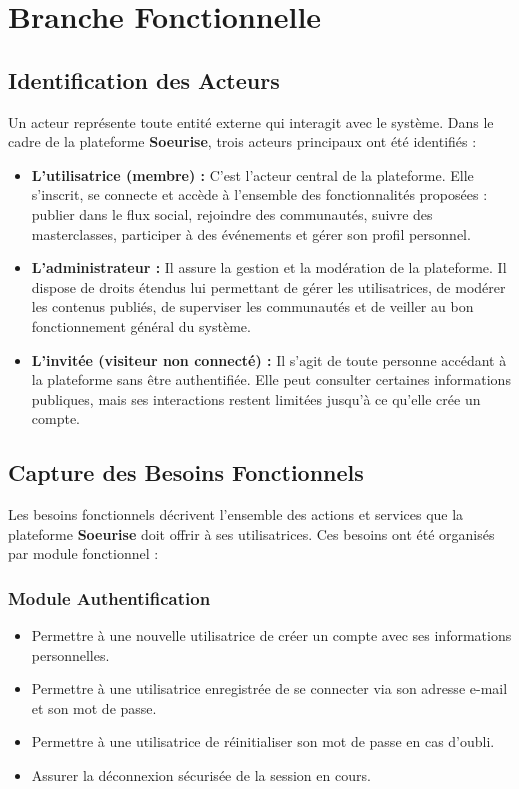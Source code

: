 \documentclass[12pt,a4paper]{report}
\begin{document}
	\section{Branche Fonctionnelle}
	
	\subsection{Identification des Acteurs}
	
	Un acteur représente toute entité externe qui interagit avec le système. Dans le 
	cadre de la plateforme \textbf{Soeurise}, trois acteurs principaux ont été identifiés :
	
	\begin{itemize}
		\item \textbf{L'utilisatrice (membre) :} C'est l'acteur central de la plateforme. 
		Elle s'inscrit, se connecte et accède à l'ensemble des fonctionnalités proposées : 
		publier dans le flux social, rejoindre des communautés, suivre des masterclasses, 
		participer à des événements et gérer son profil personnel.
		
		\item \textbf{L'administrateur :} Il assure la gestion et la modération de la 
		plateforme. Il dispose de droits étendus lui permettant de gérer les utilisatrices, 
		de modérer les contenus publiés, de superviser les communautés et de veiller 
		au bon fonctionnement général du système.
		
		\item \textbf{L'invitée (visiteur non connecté) :} Il s'agit de toute personne 
		accédant à la plateforme sans être authentifiée. Elle peut consulter certaines 
		informations publiques, mais ses interactions restent limitées jusqu'à ce qu'elle 
		crée un compte.
	\end{itemize}
	
	\subsection{Capture des Besoins Fonctionnels}
	
	Les besoins fonctionnels décrivent l'ensemble des actions et services que la 
	plateforme \textbf{Soeurise} doit offrir à ses utilisatrices. Ces besoins ont été 
	organisés par module fonctionnel :
	
	\subsubsection*{Module Authentification}
	\begin{itemize}
		\item Permettre à une nouvelle utilisatrice de créer un compte avec ses 
		informations personnelles.
		\item Permettre à une utilisatrice enregistrée de se connecter via son 
		adresse e-mail et son mot de passe.
		\item Permettre à une utilisatrice de réinitialiser son mot de passe 
		en cas d'oubli.
		\item Assurer la déconnexion sécurisée de la session en cours.
	\end{itemize}
	
\end{document}
